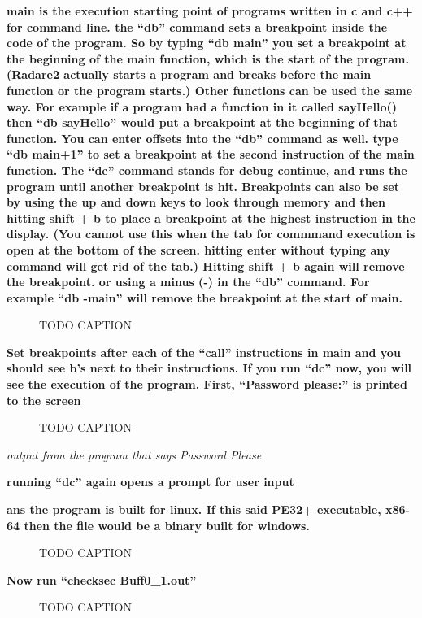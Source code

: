 \documentclass[letterpaper]{article}
\newcommand{\sitfig}[3]{
\begin{figure}[H]
\centering
\makebox[\textwidth][c]{
#2
}
\caption{#3}
\label{#1}
\end{figure}
}
\newcommand{\sitgfx}[4][scale=1.0]{
\sitfig{#3}{\texttt{[image: \#2]}}{#4}
}
\begin{document}
\textbf{main is the execution starting point of programs written in c and c++ for command line. the ``db'' command sets
a breakpoint inside the code of the program. So by typing ``db main'' you set a breakpoint at the beginning of the main
function, which is the start of the program. (Radare2 actually starts a program and breaks before the main function or
the program starts.) Other functions can be used the same way. For example if a program had a function in it called
sayHello() then ``db sayHello'' would put a breakpoint at the beginning of that function. You can enter offsets into
the ``db'' command as well. type ``db main+1'' to set a breakpoint at the second instruction of the main function. The
``dc'' command stands for debug continue, and runs the program until another breakpoint is hit. Breakpoints can also be
set by using the up and down keys to look through memory and then hitting shift + b to place a breakpoint at the
highest instruction in the display. (You cannot use this when the tab for commmand execution is open at the bottom of
the screen. hitting enter without typing any command will get rid of the tab.) Hitting shift + b again will remove the
breakpoint. or using a minus (-) in the ``db'' command. For example ``db -main'' will remove the breakpoint at the
start of main.}

  
\sitgfx[width=5.8335in,height=3.6457in]{FINALWORKINGDOCFORMERLYPRECURSOR-img081.png}{fig:unk}{TODO CAPTION}
 

\textbf{Set breakpoints after each of the ``call'' instructions in main and you should see b's next to their
instructions. If you run ``dc'' now, you will see the execution of the program. First, ``Password please:'' is printed
to the screen}

  
\sitgfx[width=5.8335in,height=3.6457in]{FINALWORKINGDOCFORMERLYPRECURSOR-img082.png}{fig:unk}{TODO CAPTION}
 

\textit{output from the program that says Password Please}

\textbf{running ``dc'' again opens a prompt for user input}

\textbf{ans the program is built for linux. If this said PE32+ executable, x86-64 then the file would be a binary built
for windows.}

  
\sitgfx[width=5.8335in,height=0.9602in]{FINALWORKINGDOCFORMERLYPRECURSOR-img074.png}{fig:unk}{TODO CAPTION}
 

\textbf{Now run ``checksec Buff0\_1.out''}  
\sitgfx[width=5.8335in,height=3.6457in]{FINALWORKINGDOCFORMERLYPRECURSOR-img083.png}{fig:unk}{TODO CAPTION}
 
\end{document}
